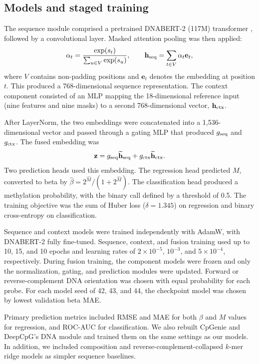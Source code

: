 \documentclass[11pt,letterpaper]{article}
\begin{document}
\subsection{Models and staged training}
The sequence module comprised a pretrained DNABERT-2 (117M) transformer \cite{zhou2024dnabert2}, followed by a convolutional layer. Masked attention pooling was then applied:
\[
\alpha_t=\frac{\exp(s_t)}{\sum_{u\in V}\exp(s_u)},\qquad
\mathbf h_{\rm seq}=\sum_{t\in V}\alpha_t\mathbf e_t,
\]
where $V$ contains non-padding positions and $\mathbf e_t$ denotes the embedding at position $t$. This produced a 768-dimensional sequence representation. The context component consisted of an MLP mapping the 18-dimensional reference input (nine features and nine masks) to a second 768-dimensional vector, $\mathbf h_{\rm ctx}$.

After LayerNorm, the two embeddings were concatenated into a 1,536-dimensional vector and passed through a gating MLP that produced $g_{\rm seq}$ and $g_{\rm ctx}$. The fused embedding was
\[
\mathbf z=g_{\rm seq}\widetilde{\mathbf h}_{\rm seq}
+g_{\rm ctx}\widetilde{\mathbf h}_{\rm ctx}.
\]
Two prediction heads used this embedding. The regression head predicted $M$, converted to beta by $\widehat\beta=2^{\widehat M}/(1+2^{\widehat M})$. The classification head produced a methylation probability, with the binary call defined by a threshold of 0.5. The training objective was the sum of Huber loss ($\delta=1.345$) on regression and binary cross-entropy on classification. 

Sequence and context models were trained independently with AdamW\cite{loshchilov2019adamw}, with DNABERT-2 fully fine-tuned. Sequence, context, and fusion training used up to 10, 15, and 10 epochs and learning rates of $2\times10^{-5}$, $10^{-3}$, and $5\times10^{-4}$, respectively. During fusion training, the component models were frozen and only the normalization, gating, and prediction modules were updated. Forward or reverse-complement DNA orientation was chosen with equal probability for each probe. For each model seed of 42, 43, and 44, the checkpoint model was chosen by lowest validation beta MAE. 

Primary prediction metrics included RMSE and MAE for both $\beta$ and $M$ values for regression, and ROC-AUC for classification. We also rebuilt CpGenie and DeepCpG's DNA module and trained them on the same settings as our models. In addition, we included composition and reverse-complement-collapsed $k$-mer ridge models as simpler sequence baselines.
\end{document}

